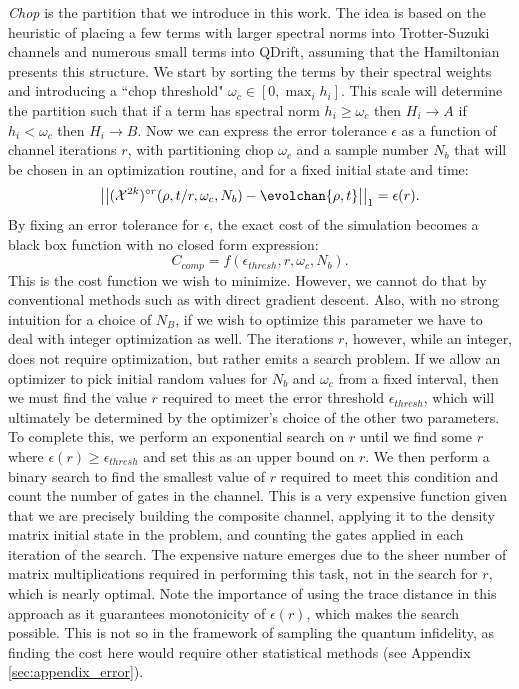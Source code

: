 \textit{Chop} is the partition that we introduce in this work. The idea is based on the heuristic of placing a few terms with larger spectral norms into Trotter-Suzuki channels and numerous small terms into QDrift, assuming that the Hamiltonian presents this structure. We start by sorting the terms by their spectral weights and introducing a ``chop threshold" $\omega_c \in [0, \max_i h_i]$. This scale will determine the partition such that if a term has spectral norm $h_i\geq\omega_c$ then $H_i\rightarrow A$ if $h_i < \omega_c$ then $H_i\rightarrow B$. Now we can express the error tolerance $\epsilon$ as a function of channel iterations $r$, with partitioning chop $\omega_c$ and a sample number $N_b$ that will be chosen in an optimization routine, and for a fixed initial state and time:
\begin{equation}\label{eq:errorfunc}
    \norm{(\mathcal{X}^{2k})^{\circ r}(\rho, t/r, \omega_c, N_b) - \evolchan{\rho, t}}_1 = \epsilon(r).
\end{equation}
%
By fixing an error tolerance for $\epsilon$, the exact cost of the simulation becomes a black box function with no closed form expression:
\begin{equation}\label{eq:cost_function}
    C_{comp} = f(\epsilon_{thresh}, r, \omega_c, N_b).
\end{equation}
This is the cost function we wish to minimize. However, we cannot do that by conventional methods such as with direct gradient descent. Also, with no strong intuition for a choice of $N_B$, if we wish to optimize this parameter we have to deal with integer optimization as well. The iterations $r$, however, while an integer, does not require optimization, but rather emits a search problem. If we allow an optimizer to pick initial random values for $N_b$ and $\omega_c$ from a fixed interval, then we must find the value $r$ required to meet the error threshold $\epsilon_{thresh}$, which will ultimately be determined by the optimizer's choice of the other two parameters. To complete this, we perform an exponential search on $r$ until we find some $r$ where $\epsilon(r) \geq \epsilon_{thresh}$ and set this as an upper bound on $r$. We then perform a binary search to find the smallest value of $r$ required to meet this condition and count the number of gates in the channel. This is a very expensive function given that we are precisely building the composite channel, applying it to the density matrix initial state in the problem, and counting the gates applied in each iteration of the search. The expensive nature emerges due to the sheer number of matrix multiplications required in performing this task, not in the search for $r$, which is nearly optimal. Note the importance of using the trace distance in this approach as it guarantees monotonicity of $\epsilon(r)$, which makes the search possible. This is not so in the framework of sampling the quantum infidelity, as finding the cost here would require other statistical methods (see Appendix \ref{sec:appendix_error}). \\

